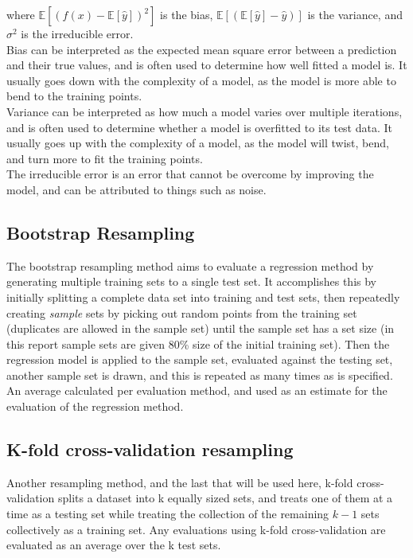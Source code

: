 \documentclass[a4paper, UKenglish]{article}
\newcommand{\0}{\mathbf{0}}
\newcommand{\1}{\mathbf{1}}
\begin{document}
where $\mathbb{E}[(f(x) - \mathbb{E}[\hat{y}])^2]$ is the bias, $\mathbb{E}[(\mathbb{E}[\hat{y}] - \hat{y})]$ is the variance, and $\sigma^2$ is the irreducible error.\\
Bias can be interpreted as the expected mean square error between a prediction and their true values, and is often used to determine how well fitted a model is. It usually goes down with the complexity of a model, as the model is more able to bend to the training points.\\
Variance can be interpreted as how much a model varies over multiple iterations, and is often used to determine whether a model is overfitted to its test data. It usually goes up with the complexity of a model, as the model will twist, bend, and turn more to fit the training points.\\
The irreducible error is an error that cannot be overcome by improving the model, and can be attributed to things such as noise.

\subsection{Bootstrap Resampling}
The bootstrap resampling method aims to evaluate a regression method by generating multiple training sets to a single test set. It accomplishes this by initially splitting a complete data set into training and test sets, then repeatedly creating \textit{sample} sets by picking out random points from the training set (duplicates are allowed in the sample set) until the sample set has a set size (in this report sample sets are given 80\% size of the initial training set). Then the regression model is applied to the sample set, evaluated against the testing set, another sample set is drawn, and this is repeated as many times as is specified. An average calculated per evaluation method, and used as an estimate for the evaluation of the regression method.

\subsection{K-fold cross-validation resampling}
Another resampling method, and the last that will be used here, k-fold cross-validation splits a dataset into k equally sized sets, and treats one of them at a time as a testing set while treating the collection of the remaining $k-1$ sets collectively as a training set. Any evaluations using k-fold cross-validation are evaluated as an average over the k test sets.
\end{document}
